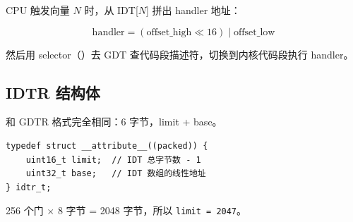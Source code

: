 CPU 触发向量 $N$ 时，从 IDT[$N$] 拼出 handler 地址：

$$\text{handler} = (\text{offset\_high} \ll 16) \;|\; \text{offset\_low}$$

然后用 selector（）去 GDT 查代码段描述符，切换到内核代码段执行 handler。

\subsection{IDTR 结构体}

和 GDTR 格式完全相同：6 字节，limit + base。

\begin{lstlisting}[style=cstyle]
typedef struct __attribute__((packed)) {
    uint16_t limit;  // IDT 总字节数 - 1
    uint32_t base;   // IDT 数组的线性地址
} idtr_t;
\end{lstlisting}

256 个门 $\times$ 8 字节 = 2048 字节，所以 \texttt{limit = 2047}。


